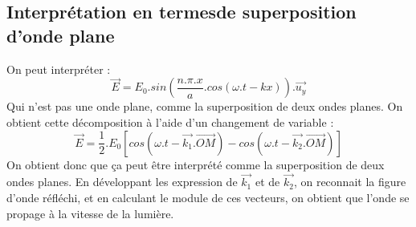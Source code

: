 \subsection{Interprétation en termesde superposition d'onde plane}
On peut interpréter :
$$\overrightarrow{E} = E_0.sin(\dfrac{n.\pi.x}{a}.cos(\omega.t - kx)).\overrightarrow{u_y}$$
Qui n'est pas une onde plane, comme la superposition de deux ondes planes. On obtient cette décomposition à l'aide d'un changement de variable : 
$$\overrightarrow{E} = \dfrac{1}{2}.E_0[cos(\omega.t - \overrightarrow{k_1}.\overrightarrow{OM}) - cos(\omega.t - \overrightarrow{k_2}.\overrightarrow{OM})]$$
On obtient donc que ça peut être interprété comme la superposition de deux ondes planes. En développant les expression de $\overrightarrow{k_1}$ et de $\overrightarrow{k_2}$, on reconnait la figure d'onde réfléchi, et en calculant le module de ces vecteurs, on obtient que l'onde se propage à la vitesse de la lumière.
